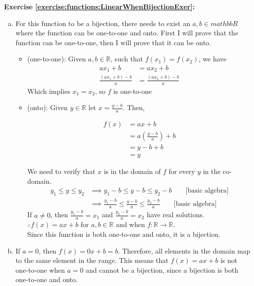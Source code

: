 \noindent\textbf{Exercise \ref{exercise:functions:LinearWhenBijectionExer}:} %
\begin{enumerate}[(a)]
\item \label{LinearWhenBijectionExer-not0}
For this function to be a bijection, there needs to exist an $a,b\in mathbb{R}$ where the function can be one-to-one and onto. First I will prove that the function can be one-to-one, then I will prove that it can be onto.
	\begin{itemize}
	\item 
	(one-to-one): Given $a,b\in \mathbb{R}$, such that $f(x_{1}) = f(x_{2})$, we have
	\begin{align*}
	ax_{1} + b &= ax_{2} + b\\
	\frac{(ax_{1} + b) - b}{a} &= \frac{(ax_{2} + b) - b}{a}
	\end{align*}
	Which implies $x_{1} = x_{2}$, so $f$ is one-to-one
	
	\item
	(onto): Given $y\in \mathbb{R}$ let $x = \frac{y-b}{a}$. Then,
	\begin{center}
	\begin{align*}
	f(x) &= ax + b\\
	&= a(\frac{y-b}{a}) + b\\
	&= y - b + b\\
	&= y
	\end{align*}
	\end{center}
	We need to verify that $x$ is in the domain of $f$ for every $y$ in the co-domain.
	\begin{align*}
	y_{1}\le y\le y_{2}  &\implies y_{1} - b\le y - b\le y_{2} - b \qquad \text{[basic algebra]}\\
	&\implies  \frac{y_{1} - b}{a}\le \frac{y - b}{a}\le \frac{y_{2} - b}{a} \qquad \text{[basic algebra]}
	\end{align*}
	If $a\neq 0$, then $\frac{y_{1} - b}{a} = x_{1}$ and $\frac{y_{2} - b}{a} = x_{2}$ have real solutions.\\
	$\therefore f(x) = ax + b$ for $a,b\in \mathbb{R}$ and when $f\colon \mathbb{R}\to \mathbb{R}$.\\
	Since this function is both one-to-one and onto, it is a bijection.\\
	\end{itemize}

\item \label{LinearWhenBijectionExer-0}
If $a = 0$, then $f(x) = 0x + b = b$. Therefore, all elements in the domain map to the same element in the range. This means that $f(x) = ax + b$ is not one-to-one when $a = 0$ and cannot be a bijection, since a bijection is both one-to-one and onto.  
\end{enumerate}

